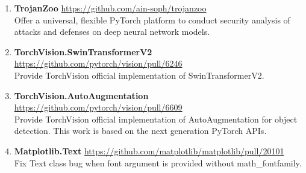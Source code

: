 \documentclass[letterpaper,11pt]{article}
\newcommand{\sociallink}[3]{\mbox{{#1}\hspace{0.5em}\href{#2}{#3}\hspace{1em}}}
\newcommand*{\website}[1]{\sociallink{\faGithub}{#1}{#1}}
\begin{document}
\begin{enumerate}[labelsep=15pt, parsep=4pt]

    \item \textbf{TrojanZoo} \hfill \website{https://github.com/ain-soph/trojanzoo}
    \vspace{0.3em}\\
    Offer a universal, flexible PyTorch platform to conduct security analysis of attacks and defenses on deep neural network models.
    
    \item \textbf{TorchVision.SwinTransformerV2} \hfill
    \website{https://github.com/pytorch/vision/pull/6246}
    \vspace{0.3em}\\
    Provide TorchVision official implementation of SwinTransformerV2.

    \item \textbf{TorchVision.AutoAugmentation} \hfill
    \website{https://github.com/pytorch/vision/pull/6609}
    \vspace{0.3em}\\
    Provide TorchVision official implementation of AutoAugmentation for object detection. This work is based on the next generation PyTorch APIs.

    \item \textbf{Matplotlib.Text} \hfill
    \website{https://github.com/matplotlib/matplotlib/pull/20101}
    \vspace{0.3em}\\
    Fix Text class bug when font argument is provided without math\_fontfamily.
    
    
\end{enumerate}
\end{document}
